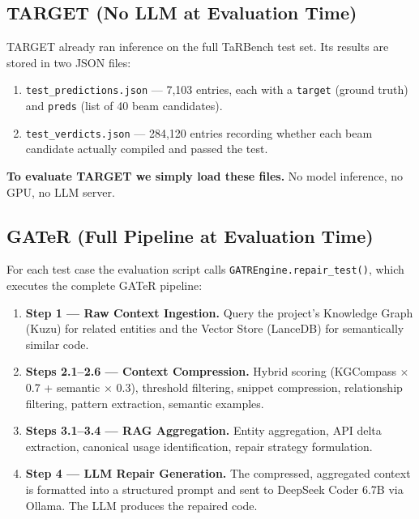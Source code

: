 \documentclass[11pt,a4paper]{article}
\begin{document}
\subsection{TARGET (No LLM at Evaluation Time)}

TARGET already ran inference on the full TaRBench test set.
Its results are stored in two JSON files:

\begin{enumerate}
    \item \texttt{test\_predictions.json} --- 7,103 entries, each with
          a \texttt{target} (ground truth) and \texttt{preds} (list of
          40 beam candidates).
    \item \texttt{test\_verdicts.json} --- 284,120 entries recording
          whether each beam candidate actually compiled and passed the test.
\end{enumerate}

\textbf{To evaluate TARGET we simply load these files.}
No model inference, no GPU, no LLM server.

\subsection{GATeR (Full Pipeline at Evaluation Time)}

For each test case the evaluation script calls
\texttt{GATREngine.repair\_test()}, which executes the complete
GATeR pipeline:

\begin{enumerate}
    \item \textbf{Step 1 --- Raw Context Ingestion.}
          Query the project's Knowledge Graph (Kuzu) for related entities
          and the Vector Store (LanceDB) for semantically similar code.
    \item \textbf{Steps 2.1--2.6 --- Context Compression.}
          Hybrid scoring (KGCompass $\times$ 0.7 + semantic $\times$ 0.3),
          threshold filtering, snippet compression, relationship filtering,
          pattern extraction, semantic examples.
    \item \textbf{Steps 3.1--3.4 --- RAG Aggregation.}
          Entity aggregation, API delta extraction, canonical usage
          identification, repair strategy formulation.
    \item \textbf{Step 4 --- LLM Repair Generation.}
          The compressed, aggregated context is formatted into a structured
          prompt and sent to DeepSeek Coder 6.7B via Ollama.
          The LLM produces the repaired code.
\end{enumerate}
\end{document}
